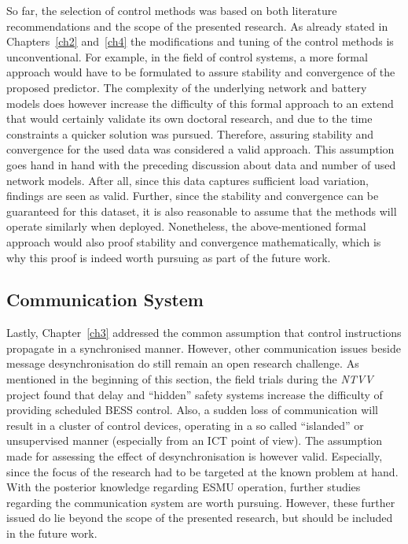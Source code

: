So far, the selection of control methods was based on both literature recommendations and the scope of the presented research.
As already stated in Chapters~\ref{ch2} and~\ref{ch4} the modifications and tuning of the control methods is unconventional.
For example, in the field of control systems, a more formal approach would have to be formulated to assure stability and convergence of the proposed predictor.
The complexity of the underlying network and battery models does however increase the difficulty of this formal approach to an extend that would certainly validate its own doctoral research, and due to the time constraints a quicker solution was pursued.
Therefore, assuring stability and convergence for the used data was considered a valid approach.
This assumption goes hand in hand with the preceding discussion about data and number of used network models.
After all, since this data captures sufficient load variation, findings are seen as valid.
Further, since the stability and convergence can be guaranteed for this dataset, it is also reasonable to assume that the methods will operate similarly when deployed.
Nonetheless, the above-mentioned formal approach would also proof stability and convergence mathematically, which is why this proof is indeed worth pursuing as part of the future work.

\subsection{Communication System}

Lastly, Chapter~\ref{ch3} addressed the common assumption that control instructions propagate in a synchronised manner.
However, other communication issues beside message desynchronisation do still remain an open research challenge.
As mentioned in the beginning of this section, the field trials during the \textit{NTVV} project found that delay and ``hidden'' safety systems increase the difficulty of providing scheduled BESS control.
Also, a sudden loss of communication will result in a cluster of control devices, operating in a so called ``islanded'' or unsupervised manner (especially from an ICT point of view).
The assumption made for assessing the effect of desynchronisation is however valid.
Especially, since the focus of the research had to be targeted at the known problem at hand.
With the posterior knowledge regarding ESMU operation, further studies regarding the communication system are worth pursuing.
However, these further issued do lie beyond the scope of the presented research, but should be included in the future work.
